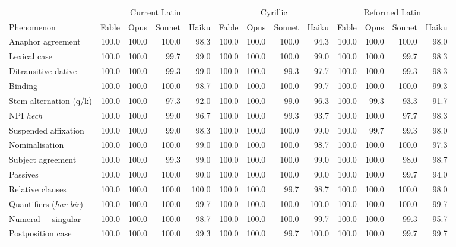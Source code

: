 \begin{table}[t]
\centering\small
\setlength{\tabcolsep}{3.5pt}
\begin{tabular}{@{}lrrrrrrrrrrrr@{}}
\toprule
 & \multicolumn{4}{c}{Current Latin} & \multicolumn{4}{c}{Cyrillic} & \multicolumn{4}{c}{Reformed Latin} \\
\cmidrule(lr){2-5}\cmidrule(lr){6-9}\cmidrule(l){10-13}
Phenomenon & Fable & Opus & Sonnet & Haiku & Fable & Opus & Sonnet & Haiku & Fable & Opus & Sonnet & Haiku \\
\midrule
Anaphor agreement & 100.0 & 100.0 & 100.0 & 98.3 & 100.0 & 100.0 & 100.0 & 94.3 & 100.0 & 100.0 & 100.0 & 98.0 \\
Lexical case & 100.0 & 100.0 & 99.7 & 99.0 & 100.0 & 100.0 & 100.0 & 99.0 & 100.0 & 100.0 & 99.7 & 98.3 \\
Ditransitive dative & 100.0 & 100.0 & 99.3 & 99.0 & 100.0 & 100.0 & 99.3 & 97.7 & 100.0 & 100.0 & 99.3 & 98.3 \\
Binding & 100.0 & 100.0 & 100.0 & 98.7 & 100.0 & 100.0 & 100.0 & 99.7 & 100.0 & 100.0 & 100.0 & 99.3 \\
Stem alternation (q/k) & 100.0 & 100.0 & 97.3 & 92.0 & 100.0 & 100.0 & 99.0 & 96.3 & 100.0 & 99.3 & 93.3 & 91.7 \\
NPI \textit{hech} & 100.0 & 100.0 & 99.0 & 96.7 & 100.0 & 100.0 & 99.3 & 93.7 & 100.0 & 100.0 & 97.7 & 98.3 \\
Suspended affixation & 100.0 & 100.0 & 99.0 & 98.3 & 100.0 & 100.0 & 100.0 & 99.0 & 100.0 & 99.7 & 99.3 & 98.0 \\
Nominalisation & 100.0 & 100.0 & 100.0 & 99.0 & 100.0 & 100.0 & 100.0 & 98.7 & 100.0 & 100.0 & 100.0 & 97.3 \\
Subject agreement & 100.0 & 100.0 & 99.3 & 99.0 & 100.0 & 100.0 & 100.0 & 99.0 & 100.0 & 100.0 & 98.0 & 98.7 \\
Passives & 100.0 & 100.0 & 100.0 & 90.0 & 100.0 & 100.0 & 100.0 & 90.0 & 100.0 & 100.0 & 99.7 & 94.0 \\
Relative clauses & 100.0 & 100.0 & 100.0 & 100.0 & 100.0 & 100.0 & 99.7 & 98.7 & 100.0 & 100.0 & 100.0 & 98.0 \\
Quantifiers (\textit{har bir}) & 100.0 & 100.0 & 100.0 & 99.7 & 100.0 & 100.0 & 100.0 & 100.0 & 100.0 & 100.0 & 100.0 & 99.7 \\
Numeral + singular & 100.0 & 100.0 & 100.0 & 98.7 & 100.0 & 100.0 & 100.0 & 99.7 & 100.0 & 100.0 & 99.3 & 95.7 \\
Postposition case & 100.0 & 100.0 & 100.0 & 99.3 & 100.0 & 100.0 & 99.7 & 100.0 & 100.0 & 100.0 & 99.7 & 99.7 \\

\end{tabular}
\end{table}
